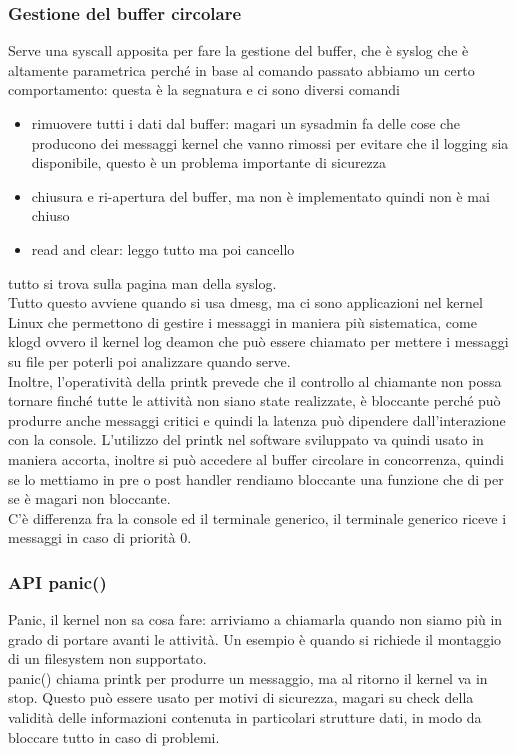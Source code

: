 \documentclass[12pt, oneside]{extbook}
\begin{document}
\subsubsection{Gestione del buffer circolare}
Serve una syscall apposita per fare la gestione del buffer, che è \textsf{syslog} che è altamente parametrica perché in base al comando passato abbiamo un certo comportamento:
questa è la segnatura
e ci sono diversi comandi
\begin{itemize}
\item rimuovere tutti i dati dal buffer: magari un sysadmin fa delle cose che producono dei messaggi kernel che vanno rimossi per evitare che il logging sia disponibile, questo è un problema importante di sicurezza
\item chiusura e ri-apertura del buffer, ma non è implementato quindi non è mai chiuso
\item read and clear: leggo tutto ma poi cancello
\end{itemize}
tutto si trova sulla pagina man della syslog.\\Tutto questo avviene quando si usa dmesg, ma ci sono applicazioni nel kernel Linux che permettono di gestire i messaggi in maniera più sistematica, come klogd ovvero il kernel log deamon che può essere chiamato per mettere i messaggi su file per poterli poi analizzare quando serve.\\ Inoltre, l'operatività della printk prevede che il controllo al chiamante non possa tornare finché tutte le attività non siano state realizzate, è bloccante perché può produrre anche messaggi critici e quindi la latenza può dipendere dall'interazione con la console. L'utilizzo del printk nel software sviluppato va quindi usato in maniera accorta, inoltre si può accedere al buffer circolare in concorrenza, quindi se lo mettiamo in pre o post handler rendiamo bloccante una funzione che di per se è magari non bloccante.\\C'è differenza fra la console ed il terminale generico, il terminale generico riceve i messaggi in caso di priorità 0.
\subsubsection{API panic()}
Panic, il kernel non sa cosa fare: arriviamo a chiamarla quando non siamo più in grado di portare avanti le attività. Un esempio è quando si richiede il montaggio di un filesystem non supportato.\\ panic() chiama printk per produrre un messaggio, ma al ritorno il kernel va in stop. Questo può essere usato per motivi di sicurezza, magari su check della validità delle informazioni contenuta in particolari strutture dati, in modo da bloccare tutto in caso di problemi.
\end{document}
